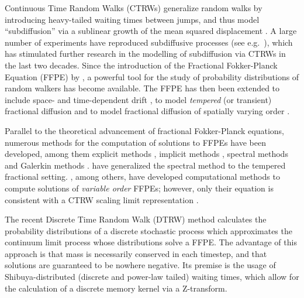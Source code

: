 \documentclass[a4paper,12pt]{elsarticle}
\numberwithin{equation}{section}
\theoremstyle{plain}
\theoremstyle{definition}
\theoremstyle{remark}
\numberwithin{equation}{section}
\newcommand{\1}{\mathbf 1}
\begin{document}
Continuous Time Random Walks (CTRWs) \citep{Scher1975} generalize random walks by introducing heavy-tailed waiting times between jumps, and thus model ``subdiffusion'' via a sublinear growth of the mean squared displacement \citep{HLS2010b}.
A large number of experiments have reproduced subdiffusive processes (see e.g.\ \cite{Metzler2000,TMT04,Wong04,Banks2005,Santamaria2006a,
Berkowitz2008,Hofling2012,Regner2013}), which has stimulated further research in the modelling of subdiffusion via CTRWs in the last two decades. Since the introduction of the Fractional Fokker-Planck Equation (FFPE) by \cite{BMK00}, a powerful tool for the study of probability distributions of random walkers has become available.
The FFPE has then been extended to include space- and time-dependent drift \citep{HLS10PRL},
to model \emph{tempered} (or transient) fractional diffusion \citep{Gajda2010,StrakaThesis,Zhang2015,Sabzikar2015}
and to model fractional diffusion of spatially varying order
\citep{Chechkin2005a, Straka17}.


Parallel to the theoretical advancement of fractional Fokker-Planck equations, numerous methods for the computation of solutions to FFPEs have been developed, among them explicit methods \citep{Yuste2005}, implicit methods \citep{Langlands2005a}, spectral methods \citep{Li2009} and Galerkin methods \citep{Mustapha2011}.
\cite{Hanert2014} have generalized the spectral method to the tempered fractional setting.  \cite{Chen2010}, among others, have developed computational methods to compute solutions of \emph{variable order} FFPEs; however, only their equation is consistent with a CTRW scaling limit representation \citep{Straka17}.

The recent Discrete Time Random Walk (DTRW) method \citep{Angstmann2015a,Angstmann2016a} calculates the probability distributions of a discrete stochastic process which approximates the continuum limit process whose distributions solve a FFPE. The advantage of this approach is that mass is necessarily conserved in each timestep, and that solutions are guaranteed to be nowhere negative.  Its premise is the usage of Shibuya-distributed (discrete and power-law tailed) waiting times, which allow for the calculation of a discrete memory kernel via a Z-transform.
\end{document}
